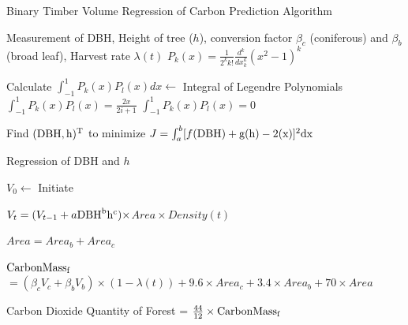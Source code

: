 \documentclass{mcmthesis}
\numberwithin{figure}{section}
\numberwithin{table}{section}
\numberwithin{equation}{section}
\begin{document}
\begin{algorithm}[htbp]
    \caption{Binary Timber Volume Regression of Carbon Prediction Algorithm}\label{Binary Volume Algo}
    \begin{algorithmic}[1]
      \Require
        Measurement of DBH, Height of tree ($ h $), conversion factor 
        $ \beta_c $  (coniferous) and $ \beta_b $ (broad leaf), Harvest rate $ \lambda(t) $ 
        $ P_k(x) = \frac{1}{2^kk!}\frac{d^k}{dx_k^k}(x^2-1)^k $

        \quad \quad Calculate $ \int_{-1}^{1}P_k(x)P_l(x)dx \gets $ Integral of Legendre Polynomials
        $ \int_{-1}^1P_k(x)P_l(x) = \frac{2x}{2i+1} $
        \Else $ \int_{-1}^1P_k(x)P_l(x) = 0 $   
        \EndIf 
        \EndFor
        \EndFor
        \EndFor
        
        \noindent Find $ (\rm{DBH}, h)^T $ to minimize  $ J = \int_a^b[f(\rm{DBH})+g(h)-2(x)]^2dx $

        Regression of DBH and $ h $  

        $V_0 \gets$ Initiate

        $ V_t = (V_{t-1}+a\rm{DBH}^bh^c)\times $$Area\times Density(t)  $
        \EndFor

        \noindent$ Area = Area_b + Area_c $

        \noindent $ \rm{CarbonMass_f} $  $= (\beta_cV_c+\beta_bV_b)\times (1-\lambda(t))+9.6\times Area_c+3.4\times Area_b + 70\times Area$

        \Ensure
        Carbon Dioxide Quantity of Forest = $\frac{44}{12}\times\rm{CarbonMass_f}$ 
    \end{algorithmic}
  \end{algorithm}
  
\end{document}

